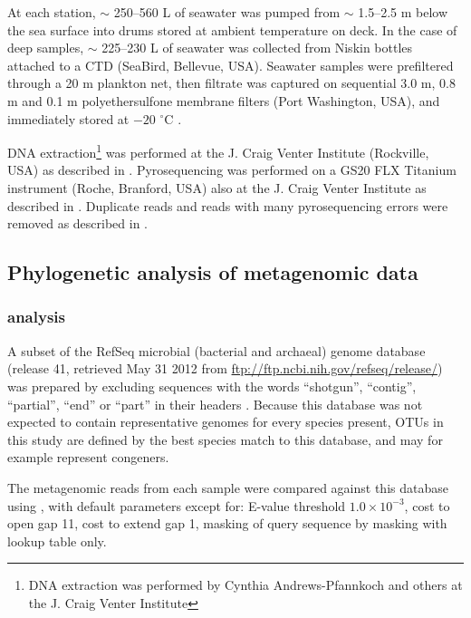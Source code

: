 

At each station, $\sim$ 250--560 L of seawater was pumped from $\sim$ 1.5--2.5 m below the sea surface into drums stored at ambient temperature on deck. 
In the case of deep samples, $\sim$ 225--230 L of seawater was collected from Niskin bottles attached to a \ac{CTD} (SeaBird, Bellevue, USA).
Seawater samples were prefiltered through a 20 \textmu{}m plankton net, then filtrate was captured on sequential 3.0 \textmu{}m, 0.8 \textmu{}m and 0.1 \textmu{}m polyethersulfone membrane filters (Port Washington, USA), and immediately stored at $-20$ $^\circ$C \cite{Rusch:2007ez,Ng:2010cd}.

DNA extraction\footnote{DNA extraction was performed by Cynthia Andrews-Pfannkoch and others at the J. Craig Venter Institute} was performed at the J. Craig Venter Institute (Rockville, USA) as described in \citet{Rusch:2007ez}.
Pyrosequencing was performed on a GS20 FLX Titanium instrument (Roche, Branford, USA) also at the J. Craig Venter Institute as described in \citet{Lauro:2010jna}.
Duplicate reads and reads with many pyrosequencing errors were removed as described in \citet{Lauro:2010jna}.

\subsection{Phylogenetic analysis of metagenomic data}

\subsubsection{ analysis}

A subset of the RefSeq microbial (bacterial and archaeal) genome database (release 41, retrieved May 31 2012 from \url{ftp://ftp.ncbi.nih.gov/refseq/release/}) was prepared by excluding sequences with the words ``shotgun'', ``contig'', ``partial'', ``end'' or ``part'' in their headers \cite{Angly:2009ip}.
Because this database was not expected to contain representative genomes for every species present, \acp{OTU} in this study are defined by the best species match to this database, and may for example represent congeners.

The metagenomic reads from each sample were compared against this database using , with default parameters except for: E-value threshold $1.0\times{}10^{-3}$, cost to open gap 11, cost to extend gap 1, masking of query sequence by  masking with lookup table only.


